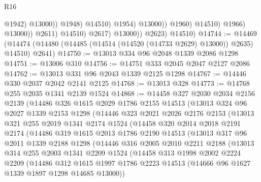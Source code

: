 \begin{lexlean}{R16}
\begin{coremodule}
                                            @1942)
                                          @13000))
                                      @1948)
                                    @14510)
                                  @1954)
                                @13000))
                            @1960)
                          @14510)
                        @1966)
                      @13000))
                  @2611)
                @14510)
              @2617)
            @13000))
        @2623)
      @14510)
@14744 := @14469
    (@14474 (@14480 (@14485 (@14514 (@14520 (@14733 @2629) @13000)) @2635) @14510) @2641)
@14750 := @13013 @334 @96 @2048 @1339 @2086 @1298
@14751 := @13006 @310
@14756 := @14751 @333 @2045 @2047 @2127 @2086
@14762 := @13013 @331 @96 @2043 @1339 @2125 @1298
@14767 := @14446 @330 @2037 @2042 @2141 @2125
@14768 := @13013 @328
@14773 := @14768 @255 @2035 @1341 @2139 @1524
@14868 := @14458
    @327
    @2030
    @2034
    @2156
    @2139
    (@14486
      @326
      @1615
      @2029
      @1786
      @2155
      @14513
      (@13013
        @324
        @96
        @2027
        @1339
        @2153
        @1298
        (@14446
          @323
          @2021
          @2026
          @2176
          @2153
          (@13013
            @321
            @255
            @2019
            @1341
            @2174
            @1524
            (@14458
              @320
              @2014
              @2018
              @2191
              @2174
              (@14486
                @319
                @1615
                @2013
                @1786
                @2190
                @14513
                (@13013
                  @317
                  @96
                  @2011
                  @1339
                  @2188
                  @1298
                  (@14446
                    @316
                    @2005
                    @2010
                    @2211
                    @2188
                    (@13013
                      @314
                      @255
                      @2003
                      @1341
                      @2209
                      @1524
                      (@14458
                        @313
                        @1998
                        @2002
                        @2224
                        @2209
                        (@14486
                          @312
                          @1615
                          @1997
                          @1786
                          @2223
                          @14513
                          (@14666 @96 @1627 @1339 @1897 @1298 @14685 @13000))

\end{coremodule}
\end{lexlean}
